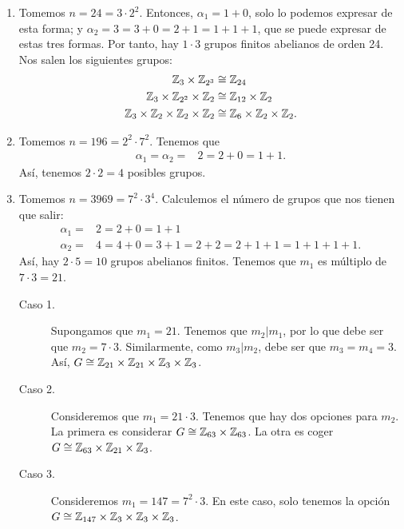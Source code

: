 \begin{eg}
\begin{enumerate}
\item Tomemos $\displaystyle n = 24  = 3 \cdot 2^{2}$. Entonces, $\displaystyle \alpha_{1} = 1 + 0 $, solo lo podemos expresar de esta forma; y $\displaystyle \alpha_{2} = 3 = 3 + 0 = 2 + 1=1+1+1 $, que se puede expresar de estas tres formas. Por tanto, hay $\displaystyle 1 \cdot 3 $ grupos finitos abelianos de orden 24. Nos salen los siguientes grupos:
	\[
	\begin{split}
		\mathbb{Z}_{3} \times \mathbb{Z}_{2^{3}} & \cong \mathbb{Z}_{24} \\
		\mathbb{Z}_{3} \times \mathbb{Z}_{2^{2}} \times \mathbb{Z}_{2} & \cong \mathbb{Z}_{12} \times \mathbb{Z}_{2} \\
		\mathbb{Z}_{3} \times \mathbb{Z}_{2} \times \mathbb{Z}_{2} \times \mathbb{Z}_{2} & \cong \mathbb{Z}_{6} \times \mathbb{Z}_{2} \times \mathbb{Z}_{2}.
	\end{split}
	\]
\item Tomemos $\displaystyle n = 196 = 2^{2} \cdot 7^{2} $. Tenemos que 
	\[
	\begin{split}
		\alpha_{1} = \alpha_{2} = & 2 = 2 + 0 = 1 + 1 .
	\end{split}
	\]
	Así, tenemos $\displaystyle 2 \cdot 2 = 4$ posibles grupos. 
\item Tomemos $\displaystyle n = 3969 = 7^{2} \cdot 3^{4} $. Calculemos el número de grupos que nos tienen que salir:
	\[
	\begin{split}
		\alpha_{1} = & 2 = 2 + 0 = 1 + 1 \\
		\alpha_{2} = & 4 = 4 + 0 = 3 + 1 = 2 + 2 = 2 + 1 + 1 = 1+ 1 + 1 + 1.
	\end{split}
	\]
	Así, hay $\displaystyle 2 \cdot 5 = 10 $ grupos abelianos finitos. Tenemos que $\displaystyle m_{1}  $ es múltiplo de $\displaystyle 7 \cdot 3 = 21 $. 
	\begin{description}
	\item[Caso 1.] Supongamos que $\displaystyle m_{1} = 21 $. Tenemos que $\displaystyle m_{2} | m_{1} $, por lo que debe ser que $\displaystyle m_{2} = 7 \cdot 3 $. Similarmente, como $\displaystyle m_{3} | m_{2} $, debe ser que $\displaystyle m_{3} = m_{4} = 3 $. Así, $\displaystyle G \cong \mathbb{Z}_{21} \times \mathbb{Z}_{21} \times \mathbb{Z}_{3}\times\mathbb{Z}_{3} $.
	\item[Caso 2.] Consideremos que $\displaystyle m_{1}=21 \cdot 3 $. Tenemos que hay dos opciones para $\displaystyle m_{2} $. La primera es considerar $\displaystyle G \cong \mathbb{Z}_{63} \times \mathbb{Z}_{63} $. La otra es coger $\displaystyle G \cong \mathbb{Z}_{63} \times \mathbb{Z}_{21} \times \mathbb{Z}_{3} $.
	\item[Caso 3.] Consideremos $\displaystyle m_{1} = 147 = 7^{2} \cdot 3 $. En este caso, solo tenemos la opción $\displaystyle G \cong \mathbb{Z}_{147} \times \mathbb{Z}_{3} \times \mathbb{Z}_{3} \times \mathbb{Z}_{3} $.

\end{description}
\end{enumerate}
\end{eg}

